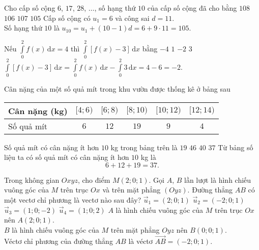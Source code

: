 \begin{ex}%
	Cho cấp số cộng $6$, $17$, $28$, $\ldots$, số hạng thứ $10$ của cấp số cộng đã cho bằng
	\choice
	{$108$}
	{$106$}
	{$107$}
	{\True $105$}
	\loigiai
	{
		Cấp số cộng có $u_1=6$ và công sai $d=11$.\\
		Số hạng thứ $10$ là $u_{10}=u_1+(10-1)d=6+9\cdot 11=105$.
	}
\end{ex}

\begin{ex}%
	Nếu $\displaystyle\int\limits_0^2f(x)\mathrm{\, d}x=4$ thì $\displaystyle\int\limits_0^2\left[f(x)-3\right]\mathrm{\, d}x$ bằng
	\choice
	{$-4$}
	{$1$}
	{\True $-2$}
	{$3$}
	\loigiai
	{
		$\displaystyle\int\limits_0^2\left[f(x)-3\right]\mathrm{\, d}x=\displaystyle\int\limits_0^2f(x)\mathrm{\, d}x-\displaystyle\int\limits_0^2 3\mathrm{\, d}x=4-6=-2$.
	}
\end{ex}

\begin{ex}%
	Cân nặng của một số quả mít trong khu vườn được thống kê ở bảng sau
	\begin{center}
		\begin{tabular}{|l|c|c|c|c|c|}
			\hline Cân nặng (kg)&{$[4;6)$}&{$[6;8)$}&{$[8;10)$}&{$[10;12)$}&{$[12;14)$}\\
			\hline Số quả mít&$6$&$12$&$19$&$9$&$4$\\
			\hline
		\end{tabular}
	\end{center}
	Số quả mít có cân nặng ít hơn $10$ kg trong bảng trên là
	\choice
	{$19$}
	{$46$}
	{$40$}
	{\True $37$}
	\loigiai
	{
		Từ bảng số liệu ta có số quả mít có cân nặng ít hơn $10$ kg là $$6+12+19=37.$$
	}
\end{ex}

\begin{ex}%
	Trong không gian $Oxyz$, cho điểm $M(2;0;1)$. Gọi $A$, $B$ lần lượt là hình chiếu vuông góc của $M$ trên trục $O x$ và trên mặt phẳng $(Oyz)$. Đường thẳng $AB$ có một vectơ chỉ phương là vectơ nào sau đây?
	\choice
	{$\vec{u}_1=(2;0;1)$}
	{\True $\vec{u}_2=(-2;0;1)$}
	{$\vec{u}_3=(1;0;-2)$}
	{$\vec{u}_4=(1;0;2)$}
	\loigiai
	{
		$A$ là hình chiếu vuông góc của $M$ trên trục $Ox$ nên $A(2;0;1)$.\\
		$B$ là hình chiếu vuông góc của $M$ trên mặt phẳng $Oyz$ nên $B(0;0;1)$.\\
		Véctơ chỉ phương của đường thẳng $AB$ là véctơ $\overrightarrow{AB}=(-2;0;1)$.
	}
\end{ex}

